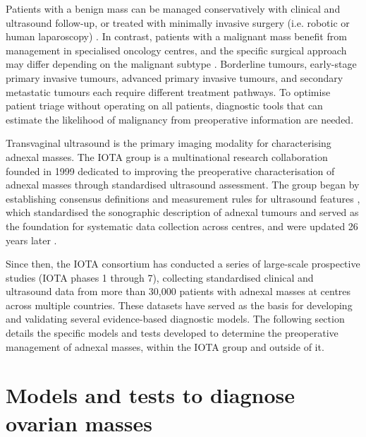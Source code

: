 Patients with a benign mass can be managed conservatively with clinical and ultrasound follow-up, or treated with minimally invasive surgery (i.e. robotic or human laparoscopy) \cite{carleyLaparoscopyLaparotomyManagement2002, froymanRiskComplicationsPatients2019}. In contrast, patients with a malignant mass benefit from management in specialised oncology centres, and the specific surgical approach may differ depending on the malignant subtype \cite{wooCentralisationServicesGynaecological2012, timmermanESGOISUOGIOTA2021}. Borderline tumours, early-stage primary invasive tumours, advanced primary invasive tumours, and secondary metastatic tumours each require different treatment pathways. To optimise patient triage without operating on all patients, diagnostic tools that can estimate the likelihood of malignancy from preoperative information are needed.

Transvaginal ultrasound is the primary imaging modality for characterising adnexal masses. The \gls{IOTA} group is a multinational research collaboration founded in 1999 dedicated to improving the preoperative characterisation of adnexal masses through standardised ultrasound assessment. The group began by establishing consensus definitions and measurement rules for ultrasound features \cite{timmermanTermsDefinitionsMeasurements2000}, which standardised the sonographic description of adnexal tumours and served as the foundation for systematic data collection across centres, and were updated 26 years later \cite{timmermanTermsDefinitionsMeasurements2026}.

Since then, the \gls{IOTA} consortium has conducted a series of large-scale prospective studies (\gls{IOTA} phases 1 through 7), collecting standardised clinical and ultrasound data from more than 30,000 patients with adnexal masses at centres across multiple countries. These datasets have served as the basis for developing and validating several evidence-based diagnostic models. The following section details the specific models and tests developed to determine the preoperative management of adnexal masses, within the IOTA group and outside of it.

\section{Models and tests to diagnose ovarian masses}

